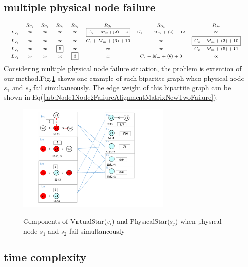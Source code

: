 \subsection{multiple physical node failure}
\label{sec:multiplePhysicalNodeFailure}
\begin{equation*}
\tiny{
 {\begin{array}{*{20}{c}}
&R_{S_1}&R_{S_2}&R_{S_3}&R_{S_4}&R_{S_5}&R_{S_6}&R_{S_{7}}\\
{L_{V_1}}&\infty&\infty&\infty&\infty&\fbox{$C_{s}+M_{m}$+(2)+12}&C_{s}++M_{m}+(2)+12&\infty\\
L_{V_2}&\infty&\infty&\infty&\infty&C_{s}+M_{m}+(3)+10&\infty&\fbox{$C_{s}+M_{m}+(3)+10$}\\
L_{V_3}&\infty&\infty&\fbox{5}&\infty&\infty&\infty&C_{s}+M_{m}+(5)+11\\
L_{V_4}&\infty&\infty&\infty&\fbox{3}&\infty&C_{s}+M_{m}+(6)+3&\infty\\
\end{array}}
}
\label{lab:Node1Node2FaliureAlignmentMatrixNewTwoFailure}
\end{equation*}
Considering multiple physical node failure situation, the problem is extention of our method.Fig.\ref{fig:StarRepresentationTwoFailure} shows one example of such  bipartite graph when physical node $s_1$ and $s_2$ fail simultaneously. The edge weight of this   bipartite graph can be shown in  Eq(\ref{lab:Node1Node2FaliureAlignmentMatrixNewTwoFailure}).
\begin{figure}
\centering
\includegraphics[width=3in]{Fig/StarRepresentationTwoFailure}\\
  \caption{Components of VirtualStar($v_i$) and PhysicalStar($s_j$) when physical node $s_1$ and $s_2$ fail simultaneously}\label{fig:StarRepresentationTwoFailure}
\end{figure}

\subsection{time complexity}

